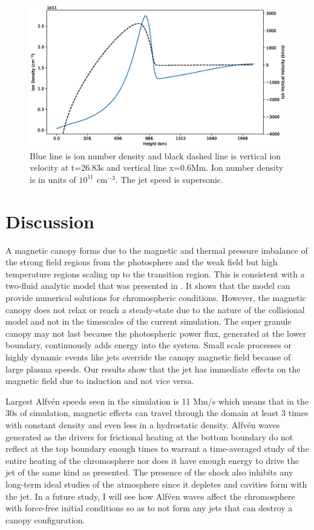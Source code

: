 \documentclass[12pt,upcase]{umlthesis}
\begin{document}
\begin{figure}[ht!]
	\centering
    \includegraphics[width=1\textwidth]{images/spiculespeed1d.eps}
    \caption{Blue line is ion number density and black dashed line is vertical ion velocity at t=26.83s and vertical line x=0.6Mm. Ion number density is in units of $10^{11}$ cm$^{-3}$. The jet speed is supersonic.}\label{fig:spiculespeed1d}
\end{figure}

\section{Discussion}\label{sec:discussion}

A magnetic canopy forms due to the magnetic and thermal pressure imbalance of the strong field regions from the photosphere and the weak field but high temperature regions scaling up to the transition region. This is consistent with a two-fluid analytic model that was presented in \citet{Song2017}. It shows that the model can provide numerical solutions for chromospheric conditions. However, the magnetic canopy does not relax or reach a steady-state due to the nature of the collisional model and not in the timescales of the current simulation. The super granule canopy may not last because the photospheric power flux, generated at the lower boundary, continuously adds energy into the system. Small scale processes or highly dynamic events like jets override the canopy magnetic field because of large plasma speeds. Our results show that the jet has immediate effects on the magnetic field due to induction and not vice versa.

Largest Alfv\'en speeds seen in the simulation is 11 Mm/s which means that in the 30s of simulation, magnetic effects can travel through the domain at least 3 times with constant density and even less in a hydrostatic density. Alfv\'en waves generated as the drivers for frictional heating at the bottom boundary do not reflect at the top boundary enough times to warrant a time-averaged study of the entire heating of the chromosphere nor does it have enough energy to drive the jet of the same kind as presented. The presence of the shock also inhibits any long-term ideal studies of the atmosphere since it depletes and cavities form with the jet. In a future study, I will see how Alf\'ven waves affect the chromosphere with force-free initial conditions so as to not form any jets that can destroy a canopy configuration.
\end{document}
